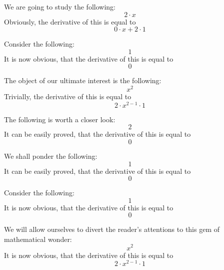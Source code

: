 \documentclass{article}
\begin{document}
We are going to study the following:
\begin{equation}
2 \cdot x 
\end{equation}
Obviously, the derivative of this is equal to
\begin{equation}
0 \cdot x + 2 \cdot 1 
\end{equation}

Consider the following:
\begin{equation}
1 
\end{equation}
It is now obvious, that the derivative of this is equal to
\begin{equation}
0 
\end{equation}

The object of our ultimate interest is the following:
\begin{equation}
x ^{2 } 
\end{equation}
Trivially, the derivative of this is equal to
\begin{equation}
2 \cdot x ^{2 - 1 } \cdot 1 
\end{equation}

The following is worth a closer look:
\begin{equation}
2 
\end{equation}
It can be easily proved, that the derivative of this is equal to
\begin{equation}
0 
\end{equation}

We shall ponder the following:
\begin{equation}
1 
\end{equation}
It can be easily proved, that the derivative of this is equal to
\begin{equation}
0 
\end{equation}

Consider the following:
\begin{equation}
1 
\end{equation}
It is now obvious, that the derivative of this is equal to
\begin{equation}
0 
\end{equation}

We will allow ourselves to divert the reader's attentions to this gem of mathematical wonder:
\begin{equation}
x ^{2 } 
\end{equation}
It is now obvious, that the derivative of this is equal to
\begin{equation}
2 \cdot x ^{2 - 1 } \cdot 1 
\end{equation}
\end{document}
